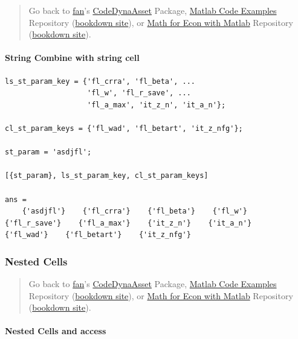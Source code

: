 \documentclass[
]{book}
\begin{document}
\begin{quote}
Go back to \href{http://fanwangecon.github.io/}{fan}'s \href{https://fanwangecon.github.io/CodeDynaAsset/}{CodeDynaAsset} Package, \href{https://fanwangecon.github.io/M4Econ/}{Matlab Code Examples} Repository (\href{https://fanwangecon.github.io/M4Econ/bookdown}{bookdown site}), or \href{https://fanwangecon.github.io/Math4Econ/}{Math for Econ with Matlab} Repository (\href{https://fanwangecon.github.io/Math4Econ/bookdown}{bookdown site}).
\end{quote}

\hypertarget{string-combine-with-string-cell}{%
\paragraph{String Combine with string cell}\label{string-combine-with-string-cell}}

\begin{verbatim}
ls_st_param_key = {'fl_crra', 'fl_beta', ...
                   'fl_w', 'fl_r_save', ...
                   'fl_a_max', 'it_z_n', 'it_a_n'};

cl_st_param_keys = {'fl_wad', 'fl_betart', 'it_z_nfg'};

st_param = 'asdjfl';

[{st_param}, ls_st_param_key, cl_st_param_keys]

ans = 
    {'asdjfl'}    {'fl_crra'}    {'fl_beta'}    {'fl_w'}    {'fl_r_save'}    {'fl_a_max'}    {'it_z_n'}    {'it_a_n'}    {'fl_wad'}    {'fl_betart'}    {'it_z_nfg'}
\end{verbatim}

\hypertarget{nested-cells}{%
\subsubsection{Nested Cells}\label{nested-cells}}

\begin{quote}
Go back to \href{http://fanwangecon.github.io/}{fan}'s \href{https://fanwangecon.github.io/CodeDynaAsset/}{CodeDynaAsset} Package, \href{https://fanwangecon.github.io/M4Econ/}{Matlab Code Examples} Repository (\href{https://fanwangecon.github.io/M4Econ/bookdown}{bookdown site}), or \href{https://fanwangecon.github.io/Math4Econ/}{Math for Econ with Matlab} Repository (\href{https://fanwangecon.github.io/Math4Econ/bookdown}{bookdown site}).
\end{quote}

\hypertarget{nested-cells-and-access}{%
\paragraph{Nested Cells and access}\label{nested-cells-and-access}}
\end{document}
